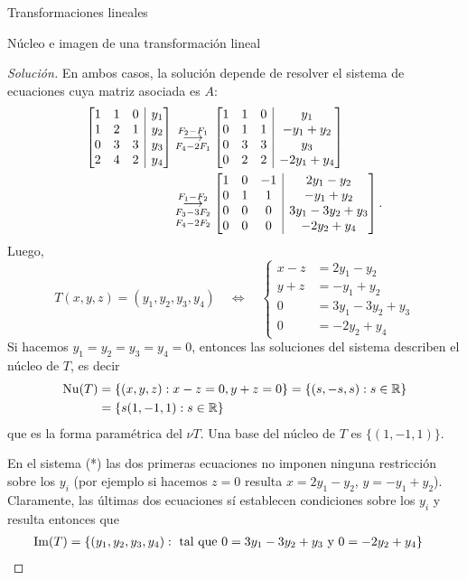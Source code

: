 \begin{chapter}{Transformaciones lineales}
\begin{section}{N\'ucleo e imagen de una transformaci\'on lineal}
\begin{proof}[Solución]
    En  ambos casos, la solución depende de resolver el sistema de ecuaciones cuya matriz asociada es $A$:
    \begin{align*}
    \left[\begin{array}{@{}*{3}{c}|c@{}}1&1&0&y_1\\1&2&1&y_2\\0&3&3&y_3\\2&4&2&y_4 \end{array}\right]
    &\underset{F_4-2F_1}{\stackrel{F_2 -F_1}{\longrightarrow}} 
    \left[\begin{array}{@{}*{3}{c}|c@{}}1&1&0&y_1\\0&1&1&-y_1+y_2\\0&3&3&y_3\\0&2&2&-2y_1 +y_4 \end{array}\right]\\
    &\underset{F_4-2F_2}{\underset{F_3-3F_2}{\stackrel{F_1 -F_2}{\longrightarrow}} } 
    \left[\begin{array}{@{}*{3}{c}|c@{}}1&0&-1&2y_1-y_2\\0&1&1&-y_1+y_2\\0&0&0&3y_1-3y_2+y_3\\0&0&0&-2y_2 +y_4 \end{array}\right].
    \end{align*}
Luego, 
    \begin{equation*}\label{eq-gen}
    T(x,y,z) = (y_1,y_2,y_3,y_4) \quad\Leftrightarrow \quad
    \left\{\begin{array}{rl}
    x -z &= 2y_1-y_2\\ 
    y +z &= -y_1+y_2\\
    0&=3y_1-3y_2+y_3 \\
    0&= -2y_2 +y_4
    \end{array}\right.\tag{*}
    \end{equation*}
    Si hacemos $y_1 = y_2 = y_3 = y_4 = 0$, entonces las soluciones del sistema describen el núcleo de $T$, es decir
    \begin{align*}
    \operatorname{Nu}(T) &= \{(x,y,z):x-z=0, y+z =0 \} = \{(s,-s,s):s \in \mathbb R \} \\
    &= \{s(1,-1,1):s \in \mathbb R \}
    \end{align*}
    que es la forma paramétrica del $\nu T$. Una base del núcleo de $T$  es $\{(1,-1,1)\}$. 


    En  el sistema (*) las dos primeras ecuaciones no imponen ninguna restricción sobre los $y_i$ (por ejemplo si hacemos $z=0$ resulta $x = 2y_1-y_2$,  $y= -y_1+y_2$). Claramente, las últimas dos ecuaciones sí establecen condiciones sobre los $y_i$ y resulta entonces que   
    \begin{align*}
        \operatorname{Im}(T) &=  \{(y_1,y_2,y_3,y_4): \text{ tal que $0=3y_1-3y_2+y_3$ y $0= -2y_2 +y_4$} \} 
    \end{align*}
    

\end{proof}
\end{section}
\end{chapter}
